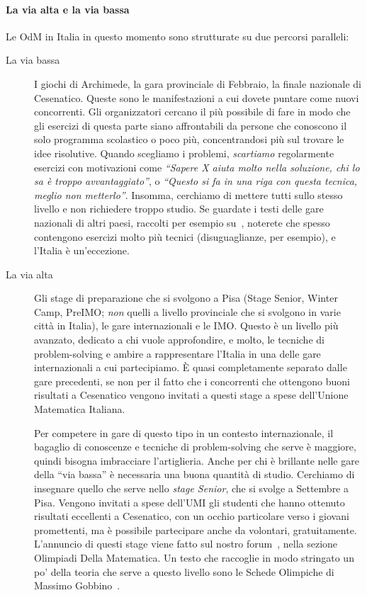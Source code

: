 \documentclass[a4paper,10pt]{paper}
\begin{document}
\paragraph{La via alta e la via bassa}
Le OdM in Italia in questo momento sono strutturate su due percorsi paralleli:
\begin{description}
\item[La via bassa] I giochi di Archimede, la gara provinciale di Febbraio, la finale nazionale di Cesenatico. Queste sono le manifestazioni a cui dovete puntare come nuovi concorrenti. Gli organizzatori cercano il più possibile di fare in modo che gli esercizi di questa parte siano affrontabili da persone che conoscono il solo programma scolastico o poco più, concentrandosi più sul trovare le idee risolutive. Quando scegliamo i problemi, \emph{scartiamo} regolarmente esercizi con motivazioni come \emph{``Sapere X aiuta molto nella soluzione, chi lo sa è troppo avvantaggiato''}, o \emph{``Questo si fa in una riga con questa tecnica, meglio non metterlo''}. Insomma, cerchiamo di mettere tutti sullo stesso livello e non richiedere troppo studio. Se guardate i testi delle gare nazionali di altri paesi, raccolti per esempio su~\cite{mathlinks}, noterete che spesso contengono esercizi molto più tecnici (disuguaglianze, per esempio), e l'Italia è un'eccezione.
 
\item[La via alta] Gli stage di preparazione che si svolgono a Pisa (Stage Senior, Winter Camp, PreIMO; \emph{non} quelli a livello provinciale che si svolgono in varie città in Italia), le gare internazionali e le IMO. Questo è un livello più avanzato, dedicato a chi vuole approfondire, e molto, le tecniche di problem-solving e ambire a rappresentare l'Italia in una delle gare internazionali a cui partecipiamo. È quasi completamente separato dalle gare precedenti, se non per il fatto che i concorrenti che ottengono buoni risultati a Cesenatico vengono invitati a questi stage a spese dell'Unione Matematica Italiana.

Per competere in gare di questo tipo in un contesto internazionale, il bagaglio di conoscenze e tecniche di problem-solving che serve è maggiore, quindi bisogna imbracciare l'artiglieria. Anche per chi è brillante nelle gare della ``via bassa'' è necessaria una buona quantità di studio. Cerchiamo di insegnare quello che serve nello \emph{stage Senior}, che si svolge a Settembre a Pisa. Vengono invitati a spese dell'UMI gli studenti che hanno ottenuto risultati eccellenti a Cesenatico, con un occhio particolare verso i giovani promettenti, ma è possibile partecipare anche da volontari, gratuitamente. L'annuncio di questi stage viene fatto sul nostro forum~\cite{oliforum}, nella sezione Olimpiadi Della Matematica. Un testo che raccoglie in modo stringato un po' della teoria che serve a questo livello sono le Schede Olimpiche di Massimo Gobbino~\cite{schedeolimpiche}. 
\end{description}
\end{document}
